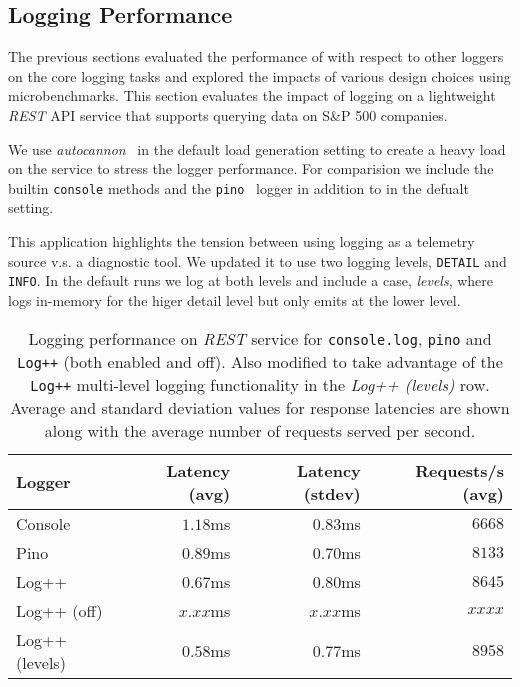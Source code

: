 \subsection{Logging Performance}
The previous sections evaluated the performance of \projn with respect to other 
loggers on the core logging tasks and explored the impacts of various design 
choices using microbenchmarks. This section evaluates the impact of logging on 
a lightweight \emph{REST} API service that supports querying data on S\&P 500 
companies. 

We use \emph{autocannon}~\cite{autocannon} in the default load generation 
setting to create a heavy load on the service to stress the logger performance.
For comparision we include the builtin \texttt{console} methods 
and the \texttt{pino}~\cite{pinologger} logger in addition to \projn in the defualt 
setting.

This application highlights the tension between using logging as a telemetry source 
v.s. a diagnostic tool. We updated it to use two logging levels, \texttt{DETAIL} 
and \texttt{INFO}. In the default runs we log at both levels and include a case, 
\emph{levels}, where \projn logs in-memory for the higer detail level but only 
emits at the lower level.

\begin{table}[t]  
    \centering
    {\small
    \begin{tabular}{l | r r r }
    Logger       & Latency (avg) & Latency (stdev) & Requests/s (avg) \\
    \hline
    Console        & $1.18$ms & $0.83$ms & $6668$   \\
    Pino           & $0.89$ms & $0.70$ms & $8133$   \\
    Log++          & $0.67$ms & $0.80$ms & $8645$   \\
    Log++ (off)    & $x.xx$ms & $x.xx$ms & $xxxx$   \\
    Log++ (levels) & $0.58$ms & $0.77$ms & $8958$   \\
    \end{tabular}
    }
    \vspace{2mm}
    \caption{Logging performance on \emph{REST} service for \texttt{console.log}, 
    \texttt{pino} and \texttt{Log++} (both enabled and off). Also modified to take advantage of the \texttt{Log++} 
    multi-level logging functionality in the \emph{Log++ (levels)} row. Average and 
    standard deviation values for response latencies are shown along with the average 
    number of requests served per second.}
    \label{tab:server}
\end{table}

